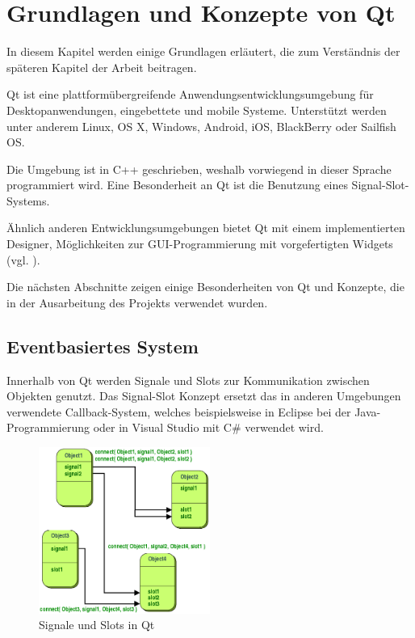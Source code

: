 
\chapter{Grundlagen und Konzepte von Qt}
\label{sec:Grundlagen}

In diesem Kapitel werden einige Grundlagen erläutert, die zum Verständnis der späteren Kapitel der Arbeit beitragen. 

Qt ist eine plattformübergreifende Anwendungsentwicklungsumgebung für Desktop\-anwendungen, eingebettete und mobile Systeme. Unterstützt werden unter anderem Linux, OS X,  Windows, Android, iOS, BlackBerry oder Sailfish OS. 

Die Umgebung ist in C++ geschrieben, weshalb vorwiegend in dieser Sprache programmiert wird. Eine Besonderheit an Qt ist die Benutzung eines Signal-Slot-Systems. 

Ähnlich anderen Entwicklungsumgebungen bietet Qt mit einem implementierten Designer, Möglichkeiten zur GUI-Programmierung mit vorgefertigten Widgets (vgl. \cite{qt_allgemein}).

Die nächsten Abschnitte zeigen einige Besonderheiten von Qt und Konzepte, die in der Ausarbeitung des Projekts verwendet wurden. 

\section{Eventbasiertes System}
\label{sec:Eventbasiert}

Innerhalb von Qt werden Signale und Slots zur Kommunikation zwischen Objekten genutzt. Das Signal-Slot Konzept ersetzt das in anderen Umgebungen verwendete Callback-System, welches beispielsweise in Eclipse bei der Java-Programmierung oder in Visual Studio mit C\# verwendet wird. 

\begin{figure}[htb]
    \centering
    \includegraphics[width=0.5\textwidth]{Abbildungen/signalslots.png}
    \caption[Signale und Slots in Qt \newline Quelle: \textit{https://doc.qt.io/qt-5/signalsandslots.html}]{Signale und Slots in Qt}		
    \label{fig:signalslots}
\end{figure}

